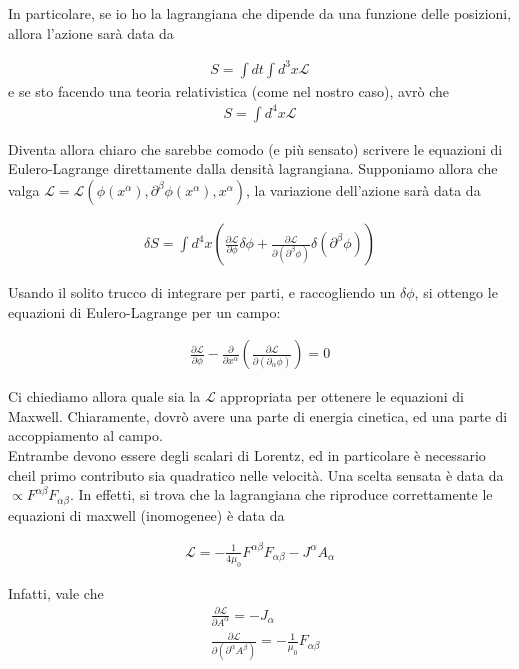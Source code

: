 \documentclass{report}
\begin{document}
In particolare, se io ho la lagrangiana che dipende da una funzione delle posizioni, allora l'azione sarà data da 

\begin{align}
    S = \int dt \int d^3x \mathcal{L}
\end{align}
e se sto facendo una teoria relativistica (come nel nostro caso), avrò che 
\begin{align}
    S = \int d^4x \mathcal{L}
\end{align}

Diventa allora chiaro che sarebbe comodo (e più sensato) scrivere le equazioni di Eulero-Lagrange direttamente dalla densità lagrangiana. Supponiamo allora che valga \(\mathcal{L} = \mathcal{L}(\phi(x^\alpha), \partial^\beta \phi(x^\alpha), x^\alpha)\), la variazione dell'azione sarà data da 

\begin{align}
    \delta S = \int d^4x \left(\frac{\partial \mathcal{L}}{\partial \phi}\delta \phi + \frac{\partial \mathcal{L}}{\partial (\partial^\beta \phi)}\delta(\partial^\beta \phi) \right)
\end{align}

Usando il solito trucco di integrare per parti, e raccogliendo un \(\delta\phi\), si ottengo le equazioni di Eulero-Lagrange per un campo: 

\begin{align}
    \frac{\partial \mathcal{L}}{\partial \phi} - \frac{\partial}{\partial x^\alpha}\left(\frac{\partial \mathcal{L}}{\partial (\partial_\alpha \phi)}\right) = 0
\end{align}

Ci chiediamo allora quale sia la \(\mathcal{L}\) appropriata per ottenere le equazioni di Maxwell. Chiaramente, dovrò avere una parte di energia cinetica, ed una parte di accoppiamento al campo. \\
Entrambe devono essere degli scalari di Lorentz, ed in particolare è necessario cheil primo contributo sia quadratico nelle velocità. Una scelta sensata è data da \(\propto F^{\alpha \beta}F_{\alpha \beta}\). In effetti, si trova che la lagrangiana che riproduce correttamente le equazioni di maxwell (inomogenee) è data da

\begin{align}
    \mathcal{L} = -\frac{1}{4\mu_0}F^{\alpha \beta}F_{\alpha \beta} - J^\alpha A_\alpha
\end{align}

Infatti, vale che 
\begin{align}
    &\frac{\partial \mathcal{L}}{\partial A^{\alpha}} = -J_\alpha \\
    &\frac{\partial \mathcal{L}}{\partial (\partial^\alpha A^\beta)} = -\frac{1}{\mu_0}F_{\alpha \beta}
\end{align}
\end{document}
